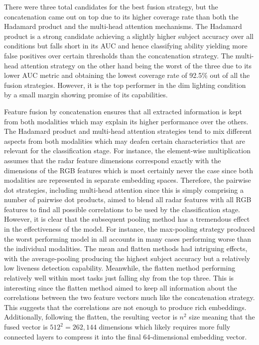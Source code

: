 \documentclass{mpaper}
\begin{document}
There were three total candidates for the best fusion strategy, but the concatenation came out on top due to its higher coverage rate than both the Hadamard product and the multi-head attention mechanisms. The Hadamard product is a strong candidate achieving a slightly higher subject accuracy over all conditions but falls short in its AUC and hence classifying ability yielding more false positives over certain thresholds than the concatenation strategy. The multi-head attention strategy on the other hand being the worst of the three due to its lower AUC metric and obtaining the lowest coverage rate of 92.5\% out of all the fusion strategies. However, it is the top performer in the dim lighting condition by a small margin showing promise of its capabilities. 

Feature fusion by concatenation ensures that all extracted information is kept from both modalities which may explain its higher performance over the others. The Hadamard product and multi-head attention strategies tend to mix different aspects from both modalities which may deafen certain characteristics that are relevant for the classification stage. For instance, the element-wise multiplication assumes that the radar feature dimensions correspond exactly with the dimensions of the RGB features which is most certainly never the case since both modalities are represented in separate embedding spaces. Therefore, the pairwise dot strategies, including multi-head attention since this is simply comprising a number of pairwise dot products, aimed to blend all radar features with all RGB features to find all possible correlations to be used by the classification stage. However, it is clear that the subsequent pooling method has a tremendous effect in the effectiveness of the model. For instance, the max-pooling strategy produced the worst performing model in all accounts in many cases performing worse than the individual modalities. The mean and flatten methods had intriguing effects, with the average-pooling producing the highest subject accuracy but a relatively low liveness detection capability. Meanwhile, the flatten method performing relatively well within most tasks just falling shy from the top three. This is interesting since the flatten method aimed to keep all information about the correlations between the two feature vectors much like the concatenation strategy. This suggests that the correlations are not enough to produce rich embeddings. Additionally, following the flatten, the resulting vector is $n^2$ size meaning that the fused vector is $512^2 = 262,144$ dimensions which likely requires more fully connected layers to compress it into the final 64-dimensional embedding vector.
\end{document}
